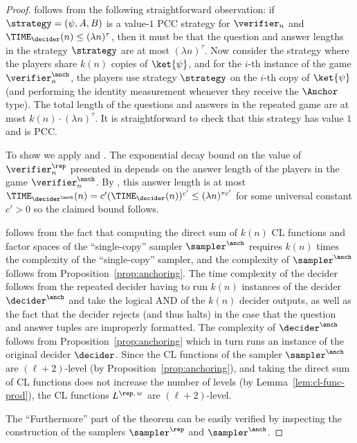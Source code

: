 \begin{proof}
	 follows from the following straightforward
  observation: if $\strategy = (\psi,A,B)$ is a value-$1$ PCC strategy for
  $\verifier_n$ and $\TIME_\decider(n) \leq (\lambda n)^\tau$, then it must be
  that the question and answer lengths in the strategy $\strategy$ are at most $(\lambda n)^\tau$. Now
  consider the strategy where the players share $k(n)$ copies of
  $\ket{\psi}$, and for the $i$-th instance of the game $\vanch_n$, the
  players use strategy $\strategy$ on the $i$-th copy of $\ket{\psi}$ (and
  performing the identity measurement whenever they receive the $\Anchor$ type). 
  The total length of the questions and answers in the repeated game are at most $k(n) \cdot (\lambda n)^\tau$. 
  It is straightforward to check that this strategy has value $1$ and is PCC.

	To show  we apply  and . 
  The exponential decay bound on the value of $\verifier^\rep_n$ presented
  in  depends on the answer length of the players in
  the game $\verifier_n^\anch$.
  By , this answer length is at most
  $\TIME_{\decider^\anch}(n) = c' (\TIME_\decider(n))^{c'} \leq (\lambda n)^{\tau c'}$ for some universal constant $c' > 0$ so the claimed bound follows.
	
	 follows from the fact that computing the direct sum
  of $k(n)$ CL functions and factor spaces of the ``single-copy'' sampler
  $\sanch$ requires $k(n)$ times the complexity of the ``single-copy''
  sampler, and the complexity of $\sanch$ follows from
  Proposition~\ref{prop:anchoring}.
	The time complexity of the decider follows from the repeated decider having to
  run $k(n)$ instances of the decider $\danch$ and take the logical AND
  of the $k(n)$ decider outputs, as well as the fact that the decider rejects (and thus halts) in the case that the question and answer tuples are improperly formatted. 
  The complexity of $\danch$ follows from
  Proposition~\ref{prop:anchoring} which in turn runs an instance of the
  original decider $\decider$.
  Since the CL functions of the sampler $\sanch$ are $(\ell+2)$-level
  (by Proposition~\ref{prop:anchoring}), and taking the direct sum of CL
  functions does not increase the number of levels (by
  Lemma~\ref{lem:cl-func-prod}), the CL functions $L^{\rep,\, w}$ are
  $(\ell+2)$-level.
  
  The ``Furthermore'' part of the theorem can be easily verified by inspecting the construction of the samplers $\sampler^\rep$ and $\sanch$. 
\end{proof}


 
